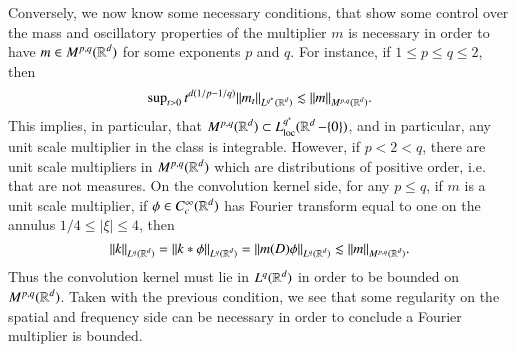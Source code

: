 %
%
%
%
Conversely, we now know some necessary conditions, that show some control over the mass and oscillatory properties of the multiplier $m$ is necessary in order to have $m \in M^{p,q}(\operatorname{\mathbb{R}}^d)$ for some exponents $p$ and $q$. For instance, if $1 \leq p \leq q \leq 2$, then
%
\[ \sup\nolimits_{t > 0} t^{d(1/p - 1/q)} \| m_t \|_{L^{q^*}(\operatorname{\mathbb{R}}^d)} \lesssim \| m \|_{M^{p,q}(\operatorname{\mathbb{R}}^d)}. \]
%
This implies, in particular, that $M^{p,q}(\operatorname{\mathbb{R}}^d) \subset L^{q^*}_{\text{loc}}(\operatorname{\mathbb{R}}^d - \{ 0 \})$, and in particular, any unit scale multiplier in the class is integrable. However, if $p < 2 < q$, there are unit scale multipliers in $M^{p,q}(\operatorname{\mathbb{R}}^d)$ which are distributions of positive order, i.e. that are not measures. On the convolution kernel side, for any $p \leq q$, if $m$ is a unit scale multiplier, if $\phi \in C_c^\infty(\operatorname{\mathbb{R}}^d)$ has Fourier transform equal to one on the annulus $1/4 \leq |\xi| \leq 4$, then
%
\[ \| k \|_{L^q(\operatorname{\mathbb{R}}^d)} = \| k * \phi \|_{L^q(\operatorname{\mathbb{R}}^d)} = \| m(D) \phi \|_{L^q(\operatorname{\mathbb{R}}^d)} \lesssim \| m \|_{M^{p,q}(\operatorname{\mathbb{R}}^d)}. \]
%
Thus the convolution kernel must lie in $L^q(\operatorname{\mathbb{R}}^d)$ in order to be bounded on $M^{p,q}(\operatorname{\mathbb{R}}^d)$. Taken with the previous condition, we see that some regularity on the spatial and frequency side can be necessary in order to conclude a Fourier multiplier is bounded.

